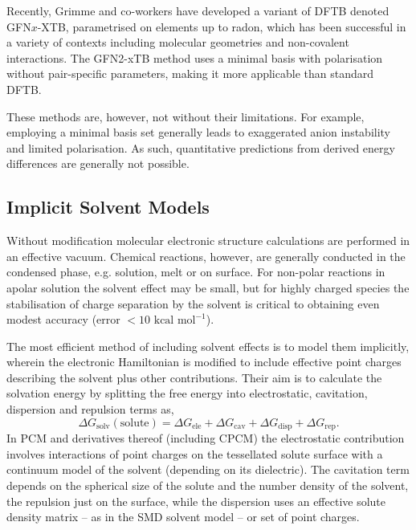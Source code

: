 \documentclass[main.tex]{subfiles}
\begin{document}
Recently, Grimme and co-workers have developed a variant of DFTB denoted GFN$x$-XTB,\cite{Grimme2017xtb} parametrised on elements up to radon, which has been successful in a variety of contexts including molecular geometries and non-covalent interactions. The GFN2-xTB method uses a minimal basis with polarisation without pair-specific parameters, making it more applicable than standard DFTB.

These methods are, however, not without their limitations. For example, employing a minimal basis set generally leads to exaggerated anion instability and limited polarisation.\cite{Addicoat2014} As such, quantitative predictions from derived energy differences are generally not possible.

\subsection{Implicit Solvent Models}

Without modification molecular electronic structure calculations are performed in an effective vacuum. Chemical reactions, however, are generally conducted in the condensed phase, e.g. solution, melt or on surface.\cite{Sievers2016} For non-polar reactions in apolar solution the solvent effect may be small,\cite{Rush2014} but for highly charged species the stabilisation of charge separation by the solvent is critical to obtaining even modest accuracy (error $< 10 \text{ kcal mol}^{-1}$).\cite{harvey2018Primer}

The most efficient method of including solvent effects is to model them implicitly, wherein the electronic Hamiltonian is modified to include effective point charges describing the solvent plus other contributions. Their aim is to calculate the solvation energy by splitting the free energy into electrostatic, cavitation, dispersion and repulsion terms as,\cite{Takano2004}
\begin{equation}
	\Delta G_\text{solv}(\text{solute}) = \Delta G_\text{ele} + \Delta G_\text{cav} + \Delta G_\text{disp} + \Delta G_\text{rep}.
\end{equation}
In PCM and derivatives thereof (including CPCM) the electrostatic contribution involves interactions of point charges on the tessellated solute surface with a continuum model of the solvent (depending on its dielectric). The cavitation term depends on the spherical size of the solute and the number density of the solvent,  the repulsion just on the surface, while the dispersion uses an effective solute density matrix -- as in the SMD solvent model\cite{Marenich2009} -- or set of point charges.\cite{Tomasi2005}
 
\end{document}
